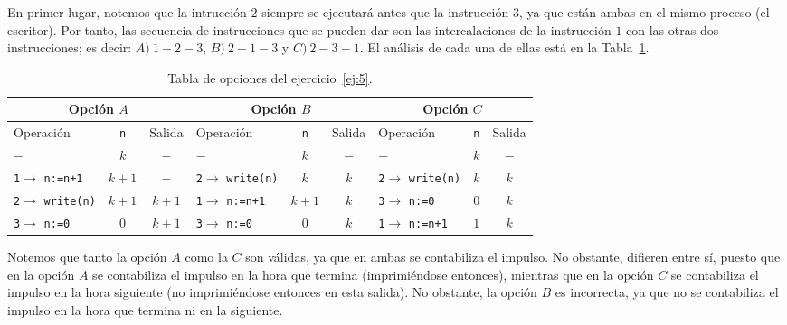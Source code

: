 \begin{ejercicio}
    En primer lugar, notemos que la intrucción $2$ siempre se ejecutará
    antes que la instrucción $3$, ya que están ambas en el mismo proceso (el escritor).
    Por tanto, las secuencia de instrucciones que se pueden dar son las intercalaciones de la instrucción $1$ con las otras dos instrucciones; es decir: $A)~1-2-3$, $B)~2-1-3$ y $C)~2-3-1$. El análisis de cada una de ellas está en la Tabla~\ref{tab:ej5}.
    \begin{table}
        \centering
        \begin{tabular}{|lcc|lcc|lcc|}
            \hline
            \multicolumn{3}{|c|}{Opción $A$} & \multicolumn{3}{|c|}{Opción $B$} & \multicolumn{3}{|c|}{Opción $C$} \\ \hline
            Operación & \verb|n| & Salida & Operación & \verb|n| & Salida & Operación & \verb|n| & Salida\\
            \hline
            $-$ & $k$ & $-$ & $-$ & $k$ & $-$ & $-$ & $k$ & $-$ \\
            \verb|1|$\to$ \verb|n:=n+1| & $k+1$ & $-$ & \verb|2|$\to$ \verb|write(n)| & $k$ & $k$ & \verb|2|$\to$ \verb|write(n)| & $k$ & $k$ \\
            \verb|2|$\to$ \verb|write(n)| & $k+1$ & $k+1$ & \verb|1|$\to$ \verb|n:=n+1| & $k+1$ & $k$ & \verb|3|$\to$ \verb|n:=0| & $0$ & $k$ \\
            \verb|3|$\to$ \verb|n:=0| & $0$ & $k+1$ & \verb|3|$\to$ \verb|n:=0| & $0$ & $k$ & \verb|1|$\to$ \verb|n:=n+1| & $1$ & $k$ \\
            \hline
        \end{tabular}
        \caption{Tabla de opciones del ejercicio~\ref{ej:5}.}
        \label{tab:ej5}
    \end{table}
    Notemos que tanto la opción $A$ como la $C$ son válidas, ya que en ambas se contabiliza el impulso. No obstante, difieren entre sí, puesto que en la opción $A$ se contabiliza el impulso en la hora que termina (imprimiéndose entonces), mientras que en la opción $C$ se contabiliza el impulso en la hora siguiente (no imprimiéndose entonces en esta salida). No obstante, la opción $B$ es incorrecta, ya que no se contabiliza el impulso en la hora que termina ni en la siguiente.
\end{ejercicio}



